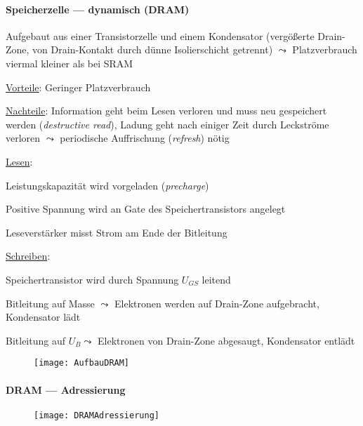 \paragraph{Speicherzelle --- dynamisch (DRAM)}
\begin{items}
	\item Aufgebaut aus einer Transistorzelle und einem Kondensator (vergößerte Drain-Zone, von Drain-Kontakt durch dünne Isolierschicht getrennt) \( \leadsto \) Platzverbrauch viermal kleiner als bei SRAM
	\item \underline{Vorteile}: Geringer Platzverbrauch
	\item \underline{Nachteile}: Information geht beim Lesen verloren und muss neu gespeichert werden (\emph{destructive read}), Ladung geht nach einiger Zeit durch Leckströme verloren \( \leadsto \) periodische Auffrischung (\emph{refresh}) nötig
	\item \underline{Lesen}:
	\begin{enumeration}
		\item Leistungskapazität wird vorgeladen (\emph{precharge})
		\item Positive Spannung wird an Gate des Speichertransistors angelegt
		\item Leseverstärker misst Strom am Ende der Bitleitung
	\end{enumeration}
	\item \underline{Schreiben}: 
	\begin{enumeration}
		\item Speichertransistor wird durch Spannung \( U_{GS} \) leitend
		\item Bitleitung auf Masse  \( \leadsto \) Elektronen werden auf Drain-Zone aufgebracht, Kondensator lädt
		\item Bitleitung auf \( U_B \leadsto \) Elektronen von Drain-Zone abgesaugt, Kondensator entlädt 
	\end{enumeration}
\end{items}
\begin{figure}[H]\centering\label{AufbauDRAM}\texttt{[image: AufbauDRAM]}\end{figure}

\newpage

\paragraph{DRAM --- Adressierung}
\begin{figure}[H]\centering\label{DRAMAdressierung}\texttt{[image: DRAMAdressierung]}\end{figure}

